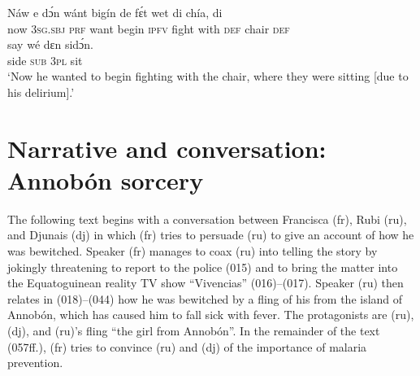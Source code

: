 {\gll
Náw  e  dɔ́n  wánt  bigín  de  fɛ́t  wet  di  chía,  di   \\
now  \textsc{3sg.sbj}  \textsc{prf}  want  begin  \textsc{ipfv}  fight  with  \textsc{def}  chair  \textsc{def}    \\
\gll
say  wé  dɛn  sidɔ́n.   \\
side  \textsc{sub}  \textsc{3pl}  sit    \\
\glt
‘Now he wanted to begin fighting with the chair, where they were sitting [due to his delirium].’
  }\z

\section{Narrative and conversation: Annobón sorcery}

The following text begins with a conversation between Francisca (fr), Rubi (ru), and Djunais (dj) in which (fr) tries to persuade (ru) to give an account of how he was bewitched. Speaker (fr) manages to coax (ru) into telling the story by jokingly threatening to report to the police (015) and to bring the matter into the Equatoguinean reality TV show “Vivencias” (016)–(017). Speaker (ru) then relates in (018)–(044) how he was bewitched by a fling of his from the island of Annobón, which has caused him to fall sick with fever. The protagonists are (ru), (dj), and (ru)’s fling “the girl from Annobón”. In the remainder of the text (057ff.), (fr) tries to convince (ru) and (dj) of the importance of malaria prevention.

\setcounter{equation}{0}  %

